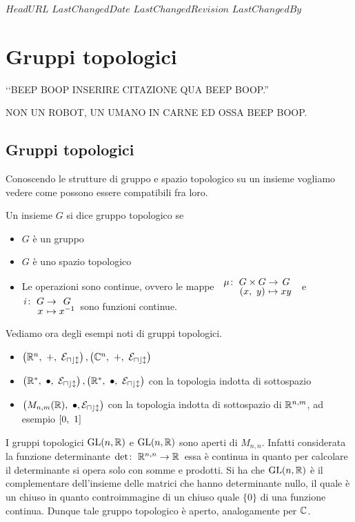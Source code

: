 \svnidlong
{$HeadURL$}
{$LastChangedDate$}
{$LastChangedRevision$}
{$LastChangedBy$}

\chapter{Gruppi topologici}

\begin{introduction}
‘‘BEEP BOOP INSERIRE CITAZIONE QUA BEEP BOOP.''
\begin{flushright}
	\textsc{NON UN ROBOT,} UN UMANO IN CARNE ED OSSA BEEP BOOP.
\end{flushright}
\end{introduction}

\section{Gruppi topologici}
Conoscendo le strutture di gruppo e spazio topologico su un insieme vogliamo vedere come possono essere compatibili fra loro.
\begin{define}
	Un insieme $G$ si dice gruppo topologico se
		\begin{itemize}
			\item $G$ è un gruppo
			\item $G$ è uno spazio topologico
			\item Le operazioni sono continue, ovvero le mappe \  $\funztot \mu {G\times G} G {(x,\ y)} {xy}$ \ e \ $\funztot i G G x {x^{-1}}$ sono funzioni continue.
		\end{itemize}
\end{define}
Vediamo ora degli esempi noti di gruppi topologici.
\begin{examples}
	\begin{itemize}
		\item $\left( \realset^n, \ +, \ \mathcal{E_{ucl}} \right), \left( \complexset ^n, \ +, \ \mathcal{E_{ucl}} \right)$
		\item $\left( \realset^*, \ \bullet,\ \mathcal{E_{ucl}} \right), \left( \realset^*, \ \bullet, \ \mathcal{E_{ucl}} \right)$ con la topologia indotta di sottospazio
		\item $\left( M_{n,m}(\mathbb{R}),\ \bullet, \mathcal{E_{ucl}} \right)$ con la topologia indotta di sottospazio di $\mathbb{R}^{n,m}$, ad esempio $\left[0,\ 1\right]$
	\end{itemize}	
\end{examples}
\begin{observe}
	I gruppi topologici $\operatorname{GL} (n,\mathbb{R} )$ e $\operatorname{GL} (n, \mathbb{R} )$ sono aperti di $M_{n,n}$.\newline
	Infatti considerata la funzione determinante $\funz \det {\realset^{n,n}} \realset$ essa è continua in quanto per calcolare il determinante si opera solo con somme e prodotti. Si ha che $\operatorname{GL}(n, \mathbb{R})$ è il complementare dell'insieme delle matrici che hanno determinante nullo, il quale è un chiuso in quanto controimmagine di un chiuso quale $\{0\}$ di una funzione continua. Dunque tale gruppo topologico è aperto, analogamente per $\mathbb{C}$.
\end{observe}
